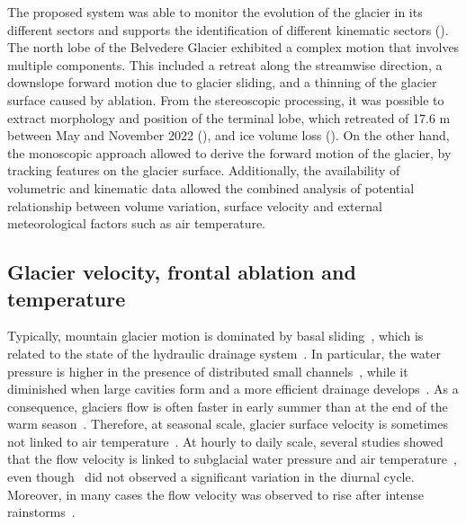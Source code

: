 The proposed system was able to monitor the evolution of the glacier in its different
sectors and supports the identification of different kinematic sectors
().
The north lobe of the Belvedere Glacier exhibited a complex motion that involves multiple
components.
This included a retreat along the streamwise direction, a downslope forward motion due to
glacier sliding, and a thinning of the glacier surface caused by ablation.
From the stereoscopic processing, it was possible to extract morphology and position of
the terminal lobe, which retreated of 17.6 m between May and November 2022
(), and ice volume loss ().
On the other hand, the monoscopic approach allowed to derive the forward motion of the
glacier, by tracking features on the glacier surface.
Additionally, the availability of volumetric and kinematic data allowed
the combined analysis of potential relationship between volume variation, surface
velocity and external meteorological factors such as air temperature.

\subsection{Glacier velocity, frontal ablation and
  temperature}\label{sec:4:discuss_velocity_ablation_temperature}

Typically, mountain glacier motion is dominated by basal sliding~\citep{willis1995intra},
which is related to the state of the hydraulic drainage
system~\citep{vincent2016sliding}.
In particular, the water pressure is higher in the presence of distributed small
channels~\citep{pimentel2011numerical}, while it diminished when large cavities form and
a more
efficient drainage develops~\citep{nienow2005hydrological}.
As a consequence, glaciers flow is often faster in early summer than at the end of the
warm season~\citep{sanders2018variations,vincent2016sliding}.
Therefore, at seasonal scale, glacier surface velocity is sometimes not linked to air
temperature~\citep{sanders2018variations}.
At hourly to daily scale, several studies showed that the flow velocity is linked to
subglacial water pressure \citep{sugiyama2010surface} and air
temperature~\citep{liu2019diurnal},
even though~\cite{allstadt2015observations} did not observed a significant variation in
the diurnal cycle.
Moreover, in many cases the flow velocity was observed to rise after intense
rainstorms~\citep{benoit2015multi,horgan2015glacier,sugiyama2010surface}.

